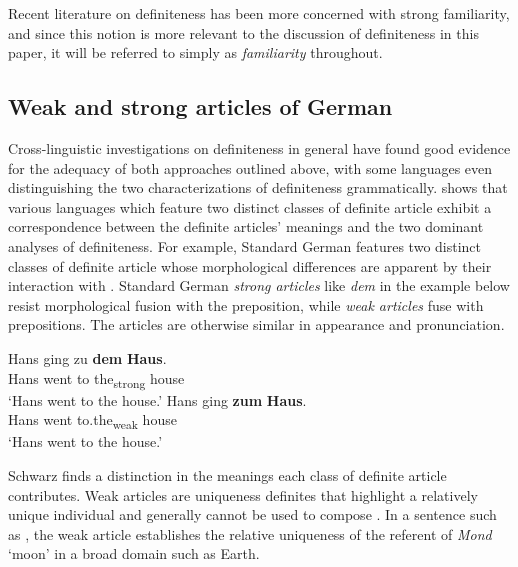 \documentclass[output=paper,modfonts,nonflat]{langsci/langscibook}
\begin{document}
Recent literature on definiteness has been more concerned with strong familiarity, and since this notion is more relevant to the discussion of definiteness in this paper, it will be referred to simply as \textit{familiarity} throughout.

\subsection{Weak and strong articles of German} \label{sec:cisneros:2.2}

Cross-linguistic investigations on definiteness in general have found good evidence for the adequacy of both approaches outlined above, with some languages even distinguishing the two characterizations of definiteness grammatically.\linebreak \citet{Schwarz2009, Schwarz2013} shows that various  languages which feature two distinct classes of definite article exhibit a correspondence between the definite articles' meanings and the two dominant analyses of definiteness.  For example, Standard German features two distinct classes of definite article whose morphological differences are apparent by their interaction with .  Standard German \textit{strong articles} like \textit{dem} in the example below resist morphological fusion with the preposition, while \textit{weak articles} fuse with prepositions.  The articles are otherwise similar in appearance and pronunciation.

\ea \label{ex:cisneros:8}
\ea
\gll
Hans ging zu \textbf{dem} \textbf{Haus}.\\
Hans went to the\textsubscript{strong} house\\
\glt
`Hans went to the house.'
\ex
\gll
Hans ging \textbf{zum} \textbf{Haus}.\\
Hans went to.the\textsubscript{weak} house\\
\glt
`Hans went to the house.'
\z
\z

Schwarz finds a distinction in the meanings each class of definite article contributes.  Weak articles are uniqueness definites that highlight a relatively unique individual and generally cannot be used to compose .  In a sentence such as , the weak article establishes the relative uniqueness of the referent of \textit{Mond} `moon' in a broad domain such as Earth.
\end{document}
